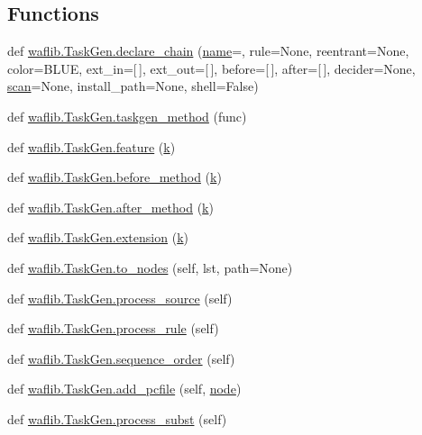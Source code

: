 \subsection*{Functions}
\begin{DoxyCompactItemize}
\item 
def \hyperlink{namespacewaflib_1_1_task_gen_ab1b4a3c17ac379029f92010b42c61562}{waflib.\+Task\+Gen.\+declare\+\_\+chain} (\hyperlink{lib_2expat_8h_a1b49b495b59f9e73205b69ad1a2965b0}{name}=\textquotesingle{}\textquotesingle{}, rule=None, reentrant=None, color=\textquotesingle{}B\+L\+UE\textquotesingle{}, ext\+\_\+in=\mbox{[}$\,$\mbox{]}, ext\+\_\+out=\mbox{[}$\,$\mbox{]}, before=\mbox{[}$\,$\mbox{]}, after=\mbox{[}$\,$\mbox{]}, decider=None, \hyperlink{seqread_8c_abbf056a5fc06531cfc2da9d8e8330393}{scan}=None, install\+\_\+path=None, shell=False)
\item 
def \hyperlink{namespacewaflib_1_1_task_gen_a7dbef0932ffa38ee03c2207d272d7974}{waflib.\+Task\+Gen.\+taskgen\+\_\+method} (func)
\item 
def \hyperlink{namespacewaflib_1_1_task_gen_a839f18f16539f3131cbe573262099bf1}{waflib.\+Task\+Gen.\+feature} (\hyperlink{rfft2d_test_m_l_8m_adc468c70fb574ebd07287b38d0d0676d}{k})
\item 
def \hyperlink{namespacewaflib_1_1_task_gen_a56d188988dd3babc77f1d283e1f8c1b1}{waflib.\+Task\+Gen.\+before\+\_\+method} (\hyperlink{rfft2d_test_m_l_8m_adc468c70fb574ebd07287b38d0d0676d}{k})
\item 
def \hyperlink{namespacewaflib_1_1_task_gen_a3411cecc8687a44154a45078c3224fb7}{waflib.\+Task\+Gen.\+after\+\_\+method} (\hyperlink{rfft2d_test_m_l_8m_adc468c70fb574ebd07287b38d0d0676d}{k})
\item 
def \hyperlink{namespacewaflib_1_1_task_gen_ab4b159e661d17937cf1be8254dedb12f}{waflib.\+Task\+Gen.\+extension} (\hyperlink{rfft2d_test_m_l_8m_adc468c70fb574ebd07287b38d0d0676d}{k})
\item 
def \hyperlink{namespacewaflib_1_1_task_gen_ad97b4407f70d2669e7d7432492f8cf04}{waflib.\+Task\+Gen.\+to\+\_\+nodes} (self, lst, path=None)
\item 
def \hyperlink{namespacewaflib_1_1_task_gen_ab61ec340af31e192a487638f29749fd2}{waflib.\+Task\+Gen.\+process\+\_\+source} (self)
\item 
def \hyperlink{namespacewaflib_1_1_task_gen_a769b126d25e4d7ef43241519266dc8c6}{waflib.\+Task\+Gen.\+process\+\_\+rule} (self)
\item 
def \hyperlink{namespacewaflib_1_1_task_gen_a5d205491eb15ecf670e07910b401a65e}{waflib.\+Task\+Gen.\+sequence\+\_\+order} (self)
\item 
def \hyperlink{namespacewaflib_1_1_task_gen_a958d404a5d65eab9676a19d7c6ee53b6}{waflib.\+Task\+Gen.\+add\+\_\+pcfile} (self, \hyperlink{structnode}{node})
\item 
def \hyperlink{namespacewaflib_1_1_task_gen_a7c83d141b0d2a372d24274a0070d9162}{waflib.\+Task\+Gen.\+process\+\_\+subst} (self)
\end{DoxyCompactItemize}
